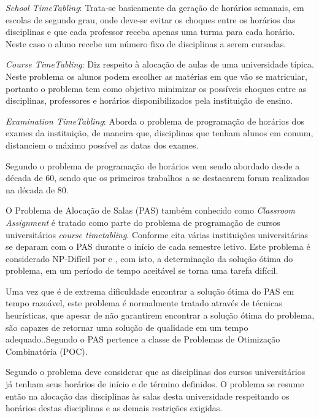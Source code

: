 \documentclass{abntpuc}
\begin{document}
\textit{School TimeTabling}: Trata-se basicamente da geração de horários semanais, em escolas de segundo grau, onde deve-se evitar os choques entre os horários das disciplinas e que cada professor receba apenas uma turma para cada horário. Neste caso o aluno recebe um número fixo de disciplinas a serem cursadas.\par

\textit{Course TimeTabling}: Diz respeito à alocação de aulas de uma universidade típica. Neste problema os alunos podem escolher as matérias em que vão se matricular, portanto o problema tem como objetivo minimizar os possíveis choques entre as disciplinas, professores e horários disponibilizados pela instituição de ensino.\par

\textit{Examination TimeTabling}: Aborda o problema de programação de horários dos exames da instituição, de maneira que, disciplinas que tenham alunos em comum, distanciem o máximo possível as datas dos exames.\par

Segundo \cite{pinheiro2001ambiente} o problema de programação de horários vem sendo abordado desde a década de 60, sendo que os primeiros trabalhos a se destacarem foram realizados na década de 80.\par

O Problema de Alocação de Salas (PAS) também conhecido como \textit{Classroom Assignment} é tratado como parte do problema de programação de cursos universitários \textit{course timetabling}. Conforme cita \cite{marinho2005heuristicas} várias instituições universitárias se deparam com o PAS durante o início de cada semestre letivo. Este problema é considerado NP-Difícil por \cite{even1975complexity} e \cite{carter1992classroom}, com isto, a determinação da solução ótima do problema, em um período de tempo aceitável se torna uma tarefa difícil.\par

Uma vez que é de extrema dificuldade encontrar a solução ótima do PAS em tempo razoável, este problema é normalmente tratado através de técnicas heurísticas, que apesar de não garantirem encontrar a solução ótima do problema, são capazes de retornar uma solução de qualidade em um tempo adequado.\cite{nascimento2005aplicaccao}.Segundo \cite{even1975complexity} o PAS pertence a classe de Problemas de Otimização Combinatória (POC).\par

Segundo \cite{kripkasimulated} o problema deve considerar que as disciplinas dos cursos universitários já tenham seus horários de início e de término definidos. O problema se resume então na alocação das disciplinas às salas desta universidade respeitando os horários destas disciplinas e as demais restrições exigidas.
\end{document}
